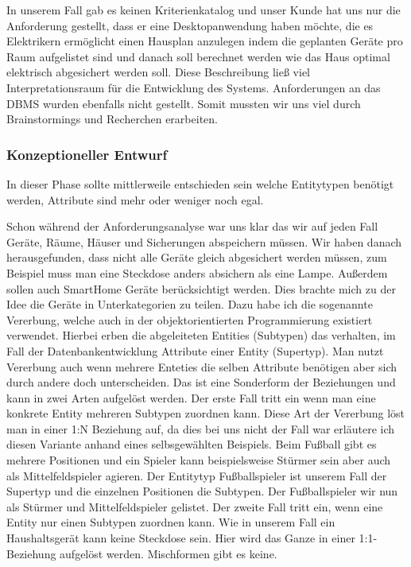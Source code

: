 \begin{flushleft}
In unserem Fall gab es keinen Kriterienkatalog und unser Kunde hat uns nur die Anforderung gestellt, dass er eine Desktopanwendung haben möchte, die es Elektrikern ermöglicht einen Hausplan anzulegen indem die geplanten Geräte pro Raum aufgelistet sind und danach soll berechnet werden wie das Haus optimal elektrisch abgesichert werden soll. Diese Beschreibung ließ viel Interpretationsraum für die Entwicklung des Systems. Anforderungen an das DBMS wurden ebenfalls nicht gestellt. Somit mussten wir uns viel durch Brainstormings und Recherchen erarbeiten.  

\subsubsection{Konzeptioneller Entwurf}

In dieser Phase sollte mittlerweile entschieden sein welche Entitytypen benötigt werden, Attribute sind mehr oder weniger noch egal.  

Schon während der Anforderungsanalyse war uns klar das wir auf jeden Fall Geräte, Räume, Häuser und Sicherungen abspeichern müssen. Wir haben danach herausgefunden, dass nicht alle Geräte gleich abgesichert werden müssen, zum Beispiel muss man eine Steckdose anders absichern als eine Lampe. Außerdem sollen auch SmartHome Geräte berücksichtigt werden. Dies brachte mich zu der Idee die Geräte in Unterkategorien zu teilen. Dazu habe ich die sogenannte Vererbung, welche auch in der objektorientierten Programmierung existiert verwendet. Hierbei erben die abgeleiteten Entities (Subtypen) das verhalten, im Fall der Datenbankentwicklung Attribute einer Entity (Supertyp).
Man nutzt Vererbung auch wenn mehrere Enteties die selben Attribute benötigen aber sich durch andere doch unterscheiden.
Das ist eine Sonderform der Beziehungen und kann in zwei Arten aufgelöst werden. 
Der erste Fall tritt ein wenn man eine konkrete Entity mehreren Subtypen zuordnen kann. Diese Art der Vererbung löst man in einer 1:N Beziehung auf, da dies bei uns nicht der Fall war erläutere ich diesen Variante anhand eines selbsgewählten Beispiels. Beim Fußball gibt es mehrere Positionen und ein Spieler kann beispielsweise Stürmer sein aber auch als Mittelfeldspieler agieren. Der Entitytyp Fußballspieler ist unserem Fall der Supertyp und die einzelnen Positionen die Subtypen. Der Fußballspieler wir nun als Stürmer und Mittelfeldspieler gelistet.
Der zweite Fall tritt ein, wenn eine Entity nur einen Subtypen zuordnen kann. Wie in unserem Fall ein Haushaltsgerät kann keine Steckdose sein. Hier wird das Ganze in einer 1:1-Beziehung aufgelöst werden.
Mischformen gibt es keine.


\end{flushleft}
